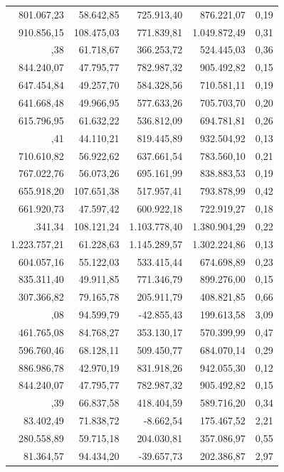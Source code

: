 \documentclass[a4paper]{article}
\begin{document}
\begin{table}
\begin{tabular}[t]{rrrrr}
801.067,23 & 58.642,85 & 725.913,40 & 876.221,07 & 0,19\\
910.856,15 & 108.475,03 & 771.839,81 & 1.049.872,49 & 0,31\\
\addlinespace
445.349,38 & 61.718,67 & 366.253,72 & 524.445,03 & 0,36\\
844.240,07 & 47.795,77 & 782.987,32 & 905.492,82 & 0,15\\
647.454,84 & 49.257,70 & 584.328,56 & 710.581,11 & 0,19\\
641.668,48 & 49.966,95 & 577.633,26 & 705.703,70 & 0,20\\
615.796,95 & 61.632,22 & 536.812,09 & 694.781,81 & 0,26\\
\addlinespace
875.975,41 & 44.110,21 & 819.445,89 & 932.504,92 & 0,13\\
710.610,82 & 56.922,62 & 637.661,54 & 783.560,10 & 0,21\\
767.022,76 & 56.073,26 & 695.161,99 & 838.883,53 & 0,19\\
655.918,20 & 107.651,38 & 517.957,41 & 793.878,99 & 0,42\\
661.920,73 & 47.597,42 & 600.922,18 & 722.919,27 & 0,18\\
\addlinespace
1.242.341,34 & 108.121,24 & 1.103.778,40 & 1.380.904,29 & 0,22\\
1.223.757,21 & 61.228,63 & 1.145.289,57 & 1.302.224,86 & 0,13\\
604.057,16 & 55.122,03 & 533.415,44 & 674.698,89 & 0,23\\
835.311,40 & 49.911,85 & 771.346,79 & 899.276,00 & 0,15\\
307.366,82 & 79.165,78 & 205.911,79 & 408.821,85 & 0,66\\
\addlinespace
78.379,08 & 94.599,79 & -42.855,43 & 199.613,58 & 3,09\\
461.765,08 & 84.768,27 & 353.130,17 & 570.399,99 & 0,47\\
596.760,46 & 68.128,11 & 509.450,77 & 684.070,14 & 0,29\\
886.986,78 & 42.970,19 & 831.918,26 & 942.055,30 & 0,12\\
844.240,07 & 47.795,77 & 782.987,32 & 905.492,82 & 0,15\\
\addlinespace
504.060,39 & 66.837,58 & 418.404,59 & 589.716,20 & 0,34\\
83.402,49 & 71.838,72 & -8.662,54 & 175.467,52 & 2,21\\
280.558,89 & 59.715,18 & 204.030,81 & 357.086,97 & 0,55\\
81.364,57 & 94.434,20 & -39.657,73 & 202.386,87 & 2,97\\

\end{tabular}
\end{table}
\end{document}
